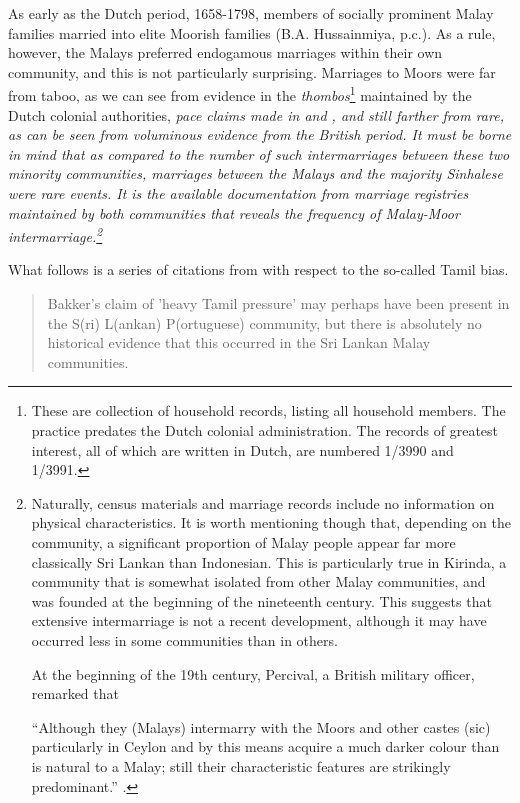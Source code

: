 As early as the Dutch period, 1658-1798, members of socially prominent Malay families married into elite Moorish families (B.A. Hussainmiya, p.c.). As a rule, however, the Malays preferred endogamous marriages within their own community, and this is not particularly surprising. Marriages to Moors were far from taboo, as we can see from evidence in the \textit{thombos}\footnote{These
  are collection of household records, listing all household members. The practice predates the Dutch colonial administration. The records of greatest interest, all of which are written in Dutch, are numbered 1/3990 and 1/3991.
} maintained by the Dutch colonial authorities, \em pace \em claims made in \citet{Ansaldo2008genesis} and \citet{Ansaldo2011a}, and still farther from rare, as can be seen from voluminous evidence from the British period. It must be borne in mind that as compared to the number of such intermarriages between these two minority communities, marriages between the Malays and the majority Sinhalese were rare events. It is the available documentation from marriage registries maintained by both communities that reveals the frequency of Malay-Moor intermarriage.\footnote{Naturally,
  census materials and marriage records include no information on physical characteristics. It is worth mentioning though that, depending on the community, a significant proportion of Malay people appear far more classically Sri Lankan than Indonesian. This is particularly true in Kirinda, a community that is somewhat isolated from other Malay communities, and was founded at the beginning of the nineteenth century. This suggests that extensive intermarriage is not a recent development, although it may have occurred less in some communities than in others.

  At the beginning of the 19th century, Percival, a British military officer, remarked that

  ``Although they (Malays) intermarry with the Moors and other castes (sic) particularly in Ceylon and by this means acquire a much darker colour than is natural to a Malay; still their characteristic features are strikingly predominant.'' \citep[115]{Percival1803}.
}

What follows is a series of citations from \citet{Ansaldo2008genesis} with respect to the so-called Tamil bias.

\begin{quote}
 Bakker's claim of 'heavy Tamil pressure' may perhaps have been present in the S(ri) L(ankan) P(ortuguese) community, but there is absolutely no historical evidence that this occurred in the Sri Lankan Malay communities. 
\end{quote}

